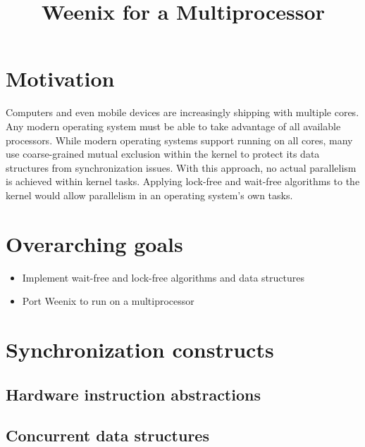 \documentclass{article}
\begin{document}
\title{Weenix for a Multiprocessor}

\maketitle

\section{Motivation}

Computers and even mobile devices are increasingly shipping with multiple cores. Any modern
operating system must be able to take advantage of all available processors. While modern
operating systems support running on all cores, many use coarse-grained mutual exclusion 
within the kernel to protect its data structures from synchronization issues. With this
approach, no actual parallelism is achieved within kernel tasks. Applying lock-free and 
wait-free algorithms to the kernel would allow parallelism in an operating system's own
tasks.

\section{Overarching goals}

\begin{itemize}
    \item Implement wait-free and lock-free algorithms and data structures
    \item Port Weenix to run on a multiprocessor
\end{itemize}

\section{Synchronization constructs}

\subsection{Hardware instruction abstractions}

\subsection{Concurrent data structures}
\end{document}
